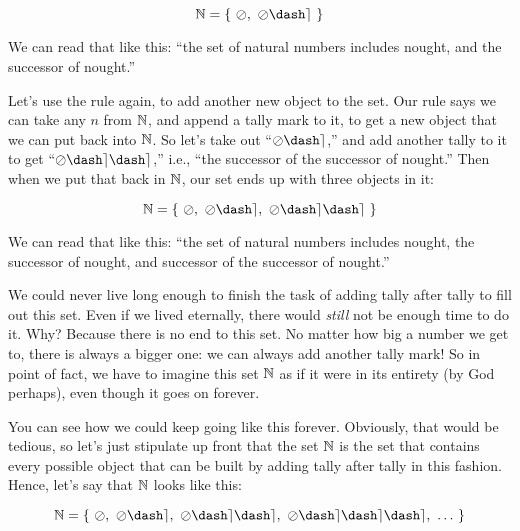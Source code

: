 \documentclass[../../../main.tex]{subfiles}
\begin{document}
\begin{equation*}
  \Nats/ = \{~\nought/,~\nought/\dash\tally/~\}
\end{equation*}

We can read that like this: ``the set of natural numbers includes nought, and the successor of nought.''

Let's use the rule again, to add another new object to the set. Our rule says we can take any $n$ from $\Nats/$, and append a tally mark to it, to get a new object that we can put back into $\Nats/$. So let's take out ``$\nought/\dash\tally/$,'' and add another tally to it to get ``$\nought/\dash\tally/\dash\tally/$,'' i.e., ``the successor of the successor of nought.'' Then when we put that back in $\Nats/$, our set ends up with three objects in it:

\begin{equation*}
  \Nats/ = \{~\nought/,~\nought/\dash\tally/,~\nought/\dash\tally/\dash\tally/~\}
\end{equation*}

We can read that like this: ``the set of natural numbers includes nought, the successor of nought, and successor of the successor of nought.''

\begin{aside}
  \begin{remark}
    We could never live long enough to finish the task of adding tally after tally to fill out this set. Even if we lived eternally, there would \emph{still} not be enough time to do it. Why? Because there is no end to this set. No matter how big a number we get to, there is always a bigger one: we can always add another tally mark! So in point of fact, we have to imagine this set $\Nats/$ as if it were  in its entirety (by God perhaps), even though it goes on forever.
  \end{remark}
\end{aside}

You can see how we could keep going like this forever. Obviously, that would be tedious, so let's just stipulate up front that the set $\Nats/$ is the set that contains every possible object that can be built by adding tally after tally in this fashion. Hence, let's say that $\Nats/$ looks like this:

\begin{equation*}
  \Nats/ = \{~\nought/,~\nought/\dash\tally/,~\nought/\dash\tally/\dash\tally/,~\nought/\dash\tally/\dash\tally/\dash\tally/,~\ldots~\}
\end{equation*}
\end{document}
